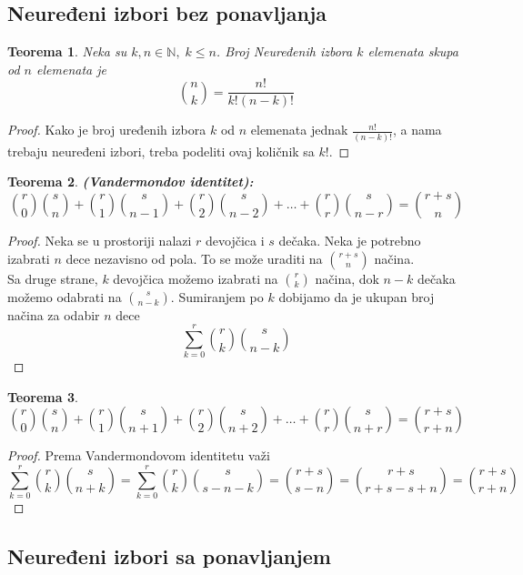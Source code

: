 \documentclass[a4paper,12pt]{article}
\numberwithin{algorithm}{section}
\theoremstyle{plain}
\newtheorem{theorem}{Teorema}[section]
\theoremstyle{definition}
\theoremstyle{remark}
\begin{document}
\subsection{Neuređeni izbori bez ponavljanja}
\begin{theorem}
    Neka su $k, n \in \mathbb{N}, \; k \leq n$. Broj Neuređenih izbora $k$ elemenata skupa od $n$ elemenata je 
    \[ {{n} \choose k} = \frac{n!}{k!(n-k)!} \]
\end{theorem}
\begin{proof}
    Kako je broj uređenih izbora $k$ od $n$ elemenata jednak $\frac{n!}{(n-k)!}$, a nama trebaju neuređeni izbori, treba podeliti ovaj količnik sa $k!$.
\end{proof}
\newpage
\begin{theorem}
    \textbf{(Vandermondov identitet):}
    \[{{r}\choose {0}}{{s} \choose n} + {{r} \choose 1}{{s} \choose {n-1}} + {{r} \choose 2}{{s} \choose n - 2} + \dots + {{r} \choose r}{{s} \choose n - r} = {{r+s} \choose n}\]
\end{theorem}
\begin{proof}
    Neka se u prostoriji nalazi $r$ devojčica i $s$ dečaka. Neka je potrebno izabrati $n$ dece nezavisno od pola. To se može uraditi na ${{r+s}\choose n}$ načina. \\

    Sa druge strane, $k$ devojčica možemo izabrati na ${{r} \choose k}$ načina, dok $n - k$ dečaka možemo odabrati na ${{s} \choose {n-k}}$. Sumiranjem po $k$ dobijamo da je ukupan broj načina za odabir $n$ dece
    \[ \sum_{k = 0}^{r}{{r} \choose k}{{s} \choose {n-k}} \]
\end{proof}

\begin{theorem}
    \[ {{r} \choose 0}{{s} \choose n} + {{r} \choose 1}{{s} \choose n + 1} + {{r} \choose 2}{{s}\choose n + 2} + \dots + {{r} \choose r}{{s} \choose {{n + r}}} = {{r + s} \choose {r + n}} \]
\end{theorem}
\begin{proof}
    Prema Vandermondovom identitetu važi
    \[\sum_{k = 0}^{r}{{r} \choose k}{{s} \choose n + k} = \sum_{k = 0}^{r}{{r} \choose k}{{s} \choose {s - n - k}} = {{r + s} \choose {s - n}} = {{r+s} \choose {r+s-s+n}} = {{r+s} \choose {r+n}}\]
\end{proof}
\subsection{Neuređeni izbori sa ponavljanjem}
\end{document}
